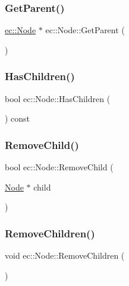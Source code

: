 \subsubsection{\texorpdfstring{Get\+Parent()}{GetParent()}}
{\footnotesize\ttfamily \mbox{\hyperlink{classec_1_1_node}{ec\+::\+Node}} $\ast$ ec\+::\+Node\+::\+Get\+Parent (\begin{DoxyParamCaption}{ }\end{DoxyParamCaption})}

\mbox{\label{classec_1_1_node_add6f4b234aebaeb7d1e76d42234b9831}} 
\subsubsection{\texorpdfstring{Has\+Children()}{HasChildren()}}
{\footnotesize\ttfamily bool ec\+::\+Node\+::\+Has\+Children (\begin{DoxyParamCaption}{ }\end{DoxyParamCaption}) const}

\mbox{\label{classec_1_1_node_a65f938c730afc4f5b4fcceb64ac84416}} 
\subsubsection{\texorpdfstring{Remove\+Child()}{RemoveChild()}}
{\footnotesize\ttfamily bool ec\+::\+Node\+::\+Remove\+Child (\begin{DoxyParamCaption}\item[{\mbox{\hyperlink{classec_1_1_node}{Node}} $\ast$}]{child }\end{DoxyParamCaption})}

\mbox{\label{classec_1_1_node_ae91a96819729bc06c17870fa8cca2129}} 
\subsubsection{\texorpdfstring{Remove\+Children()}{RemoveChildren()}}
{\footnotesize\ttfamily void ec\+::\+Node\+::\+Remove\+Children (\begin{DoxyParamCaption}{ }\end{DoxyParamCaption})}

